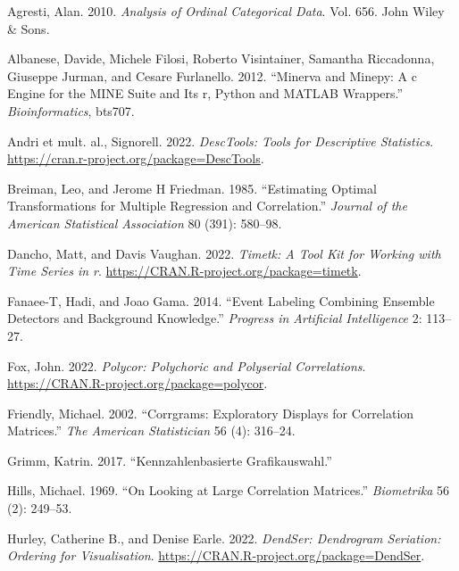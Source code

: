 \hypertarget{refs}{}
\begin{CSLReferences}{1}{0}
\leavevmode{}%
Agresti, Alan. 2010. \emph{Analysis of Ordinal Categorical Data}. Vol. 656. John Wiley \& Sons.

\leavevmode{}%
Albanese, Davide, Michele Filosi, Roberto Visintainer, Samantha Riccadonna, Giuseppe Jurman, and Cesare Furlanello. 2012. {``Minerva and Minepy: A c Engine for the MINE Suite and Its r, Python and MATLAB Wrappers.''} \emph{Bioinformatics}, bts707.

\leavevmode{}%
Andri et mult. al., Signorell. 2022. \emph{{DescTools}: Tools for Descriptive Statistics}. \url{https://cran.r-project.org/package=DescTools}.

\leavevmode{}%
Breiman, Leo, and Jerome H Friedman. 1985. {``Estimating Optimal Transformations for Multiple Regression and Correlation.''} \emph{Journal of the American Statistical Association} 80 (391): 580--98.

\leavevmode{}%
Dancho, Matt, and Davis Vaughan. 2022. \emph{Timetk: A Tool Kit for Working with Time Series in r}. \url{https://CRAN.R-project.org/package=timetk}.

\leavevmode{}%
Fanaee-T, Hadi, and Joao Gama. 2014. {``Event Labeling Combining Ensemble Detectors and Background Knowledge.''} \emph{Progress in Artificial Intelligence} 2: 113--27.

\leavevmode{}%
Fox, John. 2022. \emph{Polycor: Polychoric and Polyserial Correlations}. \url{https://CRAN.R-project.org/package=polycor}.

\leavevmode{}%
Friendly, Michael. 2002. {``Corrgrams: Exploratory Displays for Correlation Matrices.''} \emph{The American Statistician} 56 (4): 316--24.

\leavevmode{}%
Grimm, Katrin. 2017. {``Kennzahlenbasierte Grafikauswahl.''}

\leavevmode{}%
Hills, Michael. 1969. {``On Looking at Large Correlation Matrices.''} \emph{Biometrika} 56 (2): 249--53.

\leavevmode{}%
Hurley, Catherine B., and Denise Earle. 2022. \emph{DendSer: Dendrogram Seriation: Ordering for Visualisation}. \url{https://CRAN.R-project.org/package=DendSer}.


\end{CSLReferences}
